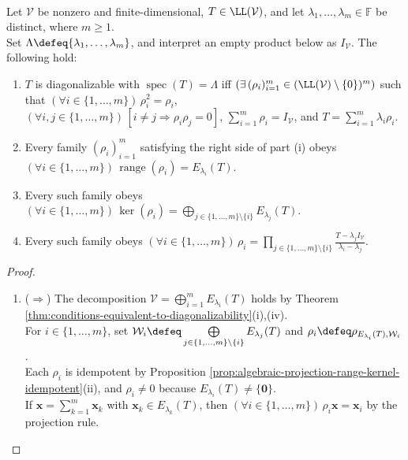 \begin{theorem} \label{thm:algebraic-spectral-resolution-diagonalizable} \\
Let $\mathcal{V}$ be nonzero and finite-dimensional, $T\in\LL(\mathcal{V})$, and let $\lambda_1,\ldots,\lambda_m\in\mathbb{F}$ be distinct, where $m\geq1$.\\
Set $\Lambda\defeq\{\lambda_1,\ldots,\lambda_m\}$, and interpret an empty product below as $I_{\mathcal{V}}$. The following hold:
\begin{enumerate}[label=(\roman*)]
\setlength{\itemsep}{0pt}
\item $T$ is diagonalizable with $\operatorname{spec}(T)=\Lambda$ iff $(\exists\,(\rho_i)_{i=1}^{m}\in(\LL(\mathcal{V})\setminus\{0\})^m)$ such that $(\forall i\in\{1,\ldots,m\})\,\rho_i^2=\rho_i$,\\
$(\forall i,j\in\{1,\ldots,m\})\,[i\neq j\Rightarrow\rho_i\rho_j=0]$, $\sum\limits_{i=1}^{m}\rho_i=I_{\mathcal{V}}$, and $T=\sum\limits_{i=1}^{m}\lambda_i\rho_i$.
\item Every family $(\rho_i)_{i=1}^{m}$ satisfying the right side of part (i) obeys $(\forall i\in\{1,\ldots,m\})\,\operatorname{range}(\rho_i)=E_{\lambda_i}(T)$.
\item Every such family obeys $(\forall i\in\{1,\ldots,m\})\,\ker(\rho_i)=\bigoplus\limits_{j\in\{1,\ldots,m\}\setminus\{i\}}E_{\lambda_j}(T)$.
\item Every such family obeys $(\forall i\in\{1,\ldots,m\})\,\rho_i=\prod\limits_{j\in\{1,\ldots,m\}\setminus\{i\}}\frac{T-\lambda_jI_{\mathcal{V}}}{\lambda_i-\lambda_j}$.
\end{enumerate}
\begin{proof}
\begin{enumerate}[label=(\roman*)]
\setlength{\itemsep}{0pt}
\item[$(i)$] ($\Rightarrow$) The decomposition $\mathcal{V}=\bigoplus\limits_{i=1}^{m}E_{\lambda_i}(T)$ holds by Theorem \ref{thm:conditions-equivalent-to-diagonalizability}(i),(iv).\\
For $i\in\{1,\ldots,m\}$, set $\mathcal{W}_i\defeq\bigoplus\limits_{j\in\{1,\ldots,m\}\setminus\{i\}}E_{\lambda_j}(T)$ and $\rho_i\defeq\rho_{E_{\lambda_i}(T),\mathcal{W}_i}$.\\
Each $\rho_i$ is idempotent by Proposition \ref{prop:algebraic-projection-range-kernel-idempotent}(ii), and $\rho_i\neq0$ because $E_{\lambda_i}(T)\neq\{\mathbf{0}\}$.\\
If $\mathbf{x}=\sum\limits_{k=1}^{m}\mathbf{x}_k$ with $\mathbf{x}_k\in E_{\lambda_k}(T)$, then $(\forall i\in\{1,\ldots,m\})\,\rho_i\mathbf{x}=\mathbf{x}_i$ by the projection rule.\\

\end{enumerate}
\end{proof}
\end{theorem}
